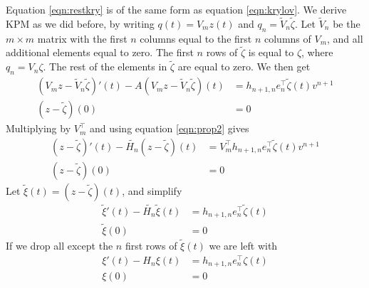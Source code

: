 Equation \eqref{eqn:restkry} is of the same form as equation \eqref{eqn:krylov}. We derive KPM as we did before, by writing $q(t) = V_m z(t)$ and $q_n = \tilde{V}_n \tilde{\zeta} $. Let $\tilde{V}_n$ be the $m \times m$ matrix with the first $n$ columns equal to the first $n$ columns of $V_m$, and all additional elements equal to zero. The first $n$ rows of  $\tilde{\zeta}$ is equal to $\zeta$, where $q_n = V_n \zeta$. The rest of the elements in $\tilde{\zeta}$ are equal to zero.
We then get
\begin{equation*}
\begin{aligned}
 (V_m z-\tilde{V}_n \tilde{\zeta})'(t)-A (V_m z-\tilde{V}_n \tilde{\zeta})(t) &=  h_{n+1,n}e_n^\top \tilde{\zeta}(t) v^{n+1}  \\
(z-\tilde{\zeta})(0)& = 0 
\end{aligned}
\end{equation*}
Multiplying by $V_m^{\top}$ and using equation \eqref{eqn:prop2} gives
\begin{equation*}
\begin{aligned}
 (z-\tilde{\zeta})'(t)-\tilde{H_n} (z-\tilde{\zeta})(t) &= V_m^\top h_{n+1,n}e_n^\top \tilde{\zeta}(t) v^{n+1}  \\
(z-\tilde{\zeta})(0)& = 0
\end{aligned}
\end{equation*}
Let $\tilde{\xi}(t) = (z-\tilde{\zeta})(t)$, and simplify
\begin{equation*} 
\begin{aligned}
 \tilde{\xi} '(t) -\tilde{H_n} \tilde{\xi}(t) &= h_{n+1,n}e_n^\top \tilde{\zeta} (t)  \\
\tilde{\xi}(0)& = 0
\end{aligned}
\end{equation*}
If we drop all except the $n$ first rows of $\tilde{\xi}(t)$ we are left with
\begin{equation}\label{eqn:restkry2}
\begin{aligned}
 \xi '(t) -H_n \xi(t) &= h_{n+1,n}e_n^\top \zeta (t)  \\
\xi(0)& = 0
\end{aligned}
\end{equation}

